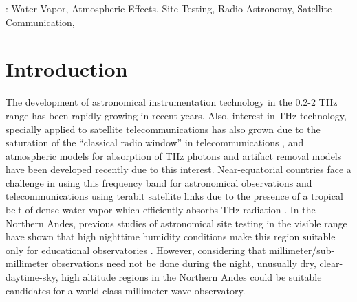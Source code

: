 \documentclass[12pt]{iopart}
\begin{document}
%
: Water Vapor, Atmospheric Effects, Site Testing, Radio Astronomy, Satellite Communication, \\
%
%
% 
%


\section{Introduction}

The development of astronomical instrumentation technology in the 0.2-2 THz range has been rapidly growing in recent years. Also, interest in THz technology, specially applied to satellite telecommunications has also grown due to the saturation of the ``classical radio window'' in telecommunications  \cite{newera}, and atmospheric models for absorption of THz photons \cite{rosenkranz,lababs} and artifact removal models \cite{removal} have been developed recently due to this interest. Near-equatorial countries face a challenge in using this frequency band for astronomical observations and telecommunications using terabit satellite links  \cite{suen2016} due to the presence of a tropical belt of dense water vapor which efficiently absorbs THz radiation \cite{tropicalbelt}. In the Northern Andes, previous studies of astronomical site testing in the visible range have shown that high nighttime humidity conditions make this region suitable only for educational observatories \cite{pinzon}. However, considering that millimeter/sub-millimeter observations need not be done during the night, unusually dry, clear-daytime-sky, high altitude regions in the Northern Andes could be suitable candidates for a world-class millimeter-wave observatory. \\
\end{document}
